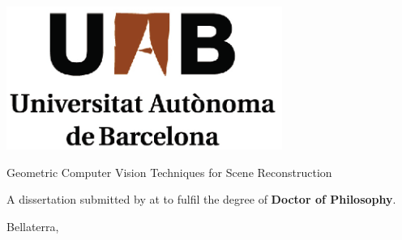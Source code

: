 \makeatletter
\begin{titlepage}
\begin{center}
\sffamily

\includegraphics[width=9cm]{images/LogoUAB}

\null\vspace{2cm}
{\Huge Geometric Computer Vision Techniques for Scene Reconstruction}  
\vfill

\end{center}

\vfill
\begin{flushright}
  \parbox{7.5cm}{A dissertation submitted by {\bf \@author} at \UAB to fulfil the degree of \textbf{Doctor of Philosophy}.\par
   \vspace*{2mm}
   \hfill Bellaterra, \@date
  }
\end{flushright}
  
\end{titlepage}

